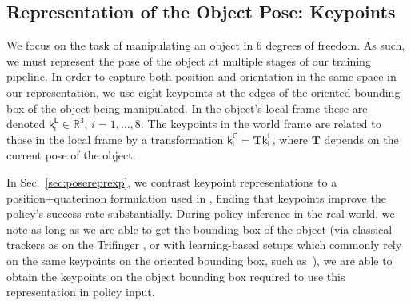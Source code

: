 \documentclass[letterpaper, 10 pt, conference]{ieeeconf}  %
\newcommand{\secref}[1]{Sec.~\ref{#1}}
\begin{document}
\subsection{Representation of the Object Pose: Keypoints}
\label{sec:poserepr}

We focus on the task of manipulating an object in 6 degrees of freedom. As such, we must represent the pose of the object at multiple stages of our training pipeline. In order to capture both position and orientation in the same space in our representation, we use eight keypoints at the edges of the oriented bounding box of the object being manipulated. In the object's local frame these are denoted $\mathsf{k^L_i} \in \mathbb{R}^3, \, i=1, \dots, 8$. The keypoints in the world frame are related to those in the local frame by a transformation $\mathsf{k^C_i} = \mathbf{T} \mathsf{k^L_i}$, where $\mathbf{T}$ depends on the current pose of the object.

In \secref{sec:posereprexp}, we contrast keypoint representations to a position+quaterinon formulation used in \citep{openai-sh, pmlr-v87-liang18a}, finding that keypoints improve the policy's success rate substantially. During policy inference in the real world, we note as long as we are able to get the bounding box of the object (via classical trackers as on the Trifinger \citep{trifinger-object-tracking}, or with learning-based setups which commonly rely on the same keypoints on the oriented bounding box, such as~\citep{tremblay2018deep, cosypose}), we are able to obtain the keypoints on the object bounding box required to use this representation in policy input.



\end{document}
